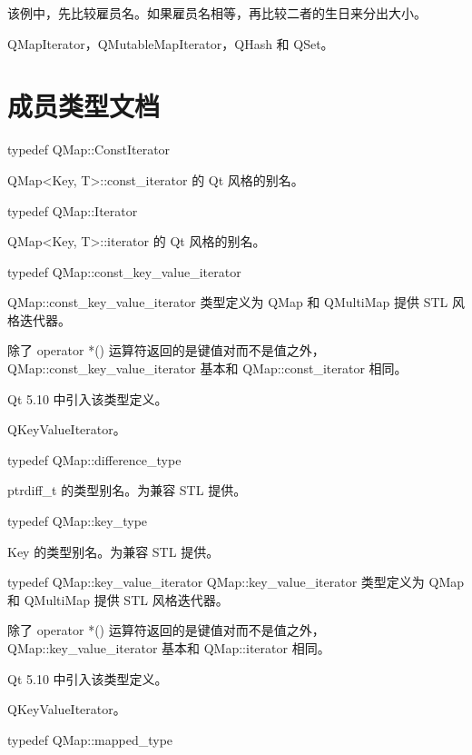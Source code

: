 该例中，先比较雇员名。如果雇员名相等，再比较二者的生日来分出大小。

\begin{notice}[另请参阅]
QMapIterator，QMutableMapIterator，QHash 和 QSet。
\end{notice}

\section{成员类型文档}

typedef QMap::ConstIterator

QMap<Key, T>::const\_iterator 的 Qt 风格的别名。

\splitLine

typedef QMap::Iterator

QMap<Key, T>::iterator 的 Qt 风格的别名。

\splitLine

typedef QMap::const\_key\_value\_iterator

QMap::const\_key\_value\_iterator 类型定义为 QMap 和 QMultiMap 提供 STL 风格迭代器。

除了 operator *() 运算符返回的是键值对而不是值之外，QMap::const\_key\_value\_iterator 基本和 QMap::const\_iterator 相同。

Qt 5.10 中引入该类型定义。

\begin{notice}[另请参阅]
QKeyValueIterator。
\end{notice}

\splitLine

typedef QMap::difference\_type

ptrdiff\_t 的类型别名。为兼容 STL 提供。

typedef QMap::key\_type

Key 的类型别名。为兼容 STL 提供。

\splitLine

typedef QMap::key\_value\_iterator
QMap::key\_value\_iterator 类型定义为 QMap 和 QMultiMap 提供 STL 风格迭代器。

除了 operator *() 运算符返回的是键值对而不是值之外，QMap::key\_value\_iterator 基本和 QMap::iterator 相同。

Qt 5.10 中引入该类型定义。

\begin{notice}[另请参阅]
QKeyValueIterator。
\end{notice}

\splitLine

typedef QMap::mapped\_type

